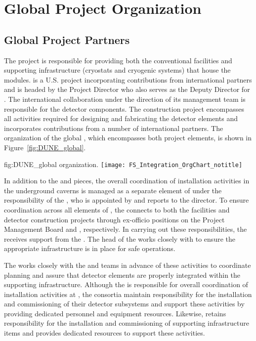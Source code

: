 \chapter{Global Project Organization}
\label{vl:tc-global}

\section{Global Project Partners}
\label{sec:partners}

The  project is responsible for providing both the
conventional facilities and supporting infrastructure (cryostats and
cryogenic systems) that house the  
modules.  is a U.S.  project incorporating
contributions from international partners and is headed by the
 Project Director who also serves as the 
Deputy Director for .  The international 
collaboration under the direction of its management team is
responsible for the detector components.  The  
construction project encompasses all activities required for designing
and fabricating the detector elements and incorporates contributions
from a number of international partners.  The organization of the
global , which encompasses both project elements, is
shown in Figure~\ref{fig:DUNE_global}.
\begin{dunefigure}{fig:DUNE_global}
  { organization.}
  \texttt{[image: FS\_Integration\_OrgChart\_notitle]}
\end{dunefigure}

In addition to the  and  pieces, the overall
coordination of installation activities in the underground caverns is
managed as a separate element of  under the
responsibility of the , who is appointed by and reports
to the  director.  To ensure coordination across
all elements of , the  connects to both
the facilities and detector construction projects through ex-officio
positions on the  Project Management Board and
 , respectively.  In carrying out these
responsibilities, the  receives support from the
 .  The head of the  works closely
with  to ensure the appropriate infrastructure is in place
for safe operations.


The  works closely with the  and 
teams in advance of these activities to coordinate planning
and assure that detector elements are properly integrated within the 
supporting infrastructure.  Although the  is responsible 
for overall coordination of  installation activities
at , the  consortia maintain responsibility 
for the installation and commissioning of their detector subsystems
and support these activities by providing dedicated personnel and
equipment resources.  Likewise,  retains responsibility
for the installation and commissioning of supporting infrastructure
items and provides dedicated resources to support these activities.          

